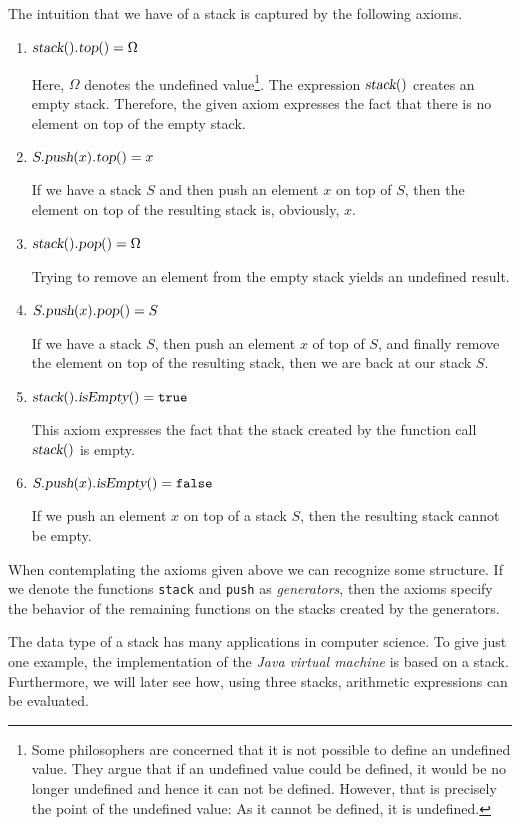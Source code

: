 The intuition that we have of a stack is captured by the following axioms.
\begin{enumerate}
\item $\textsl{stack}().\textsl{top}() = \Omega$

      Here, $\Omega$ denotes the undefined value\footnote{
       Some philosophers are concerned that it is not possible to define an undefined value.
       They argue that if an undefined value could be defined, it would be no longer undefined
       and hence it can not be defined.  However, that is precisely the point of the undefined 
       value: As it cannot be defined, it is undefined. \raisebox{-0.1cm}{$\Large\smiley$}}.  
      The expression $\textsl{stack}()$
      creates an empty stack.  Therefore, the given axiom expresses the fact that there is no
      element on top of the empty stack.
\item $S.\textsl{push}(x).\textsl{top}() = x$

      If we have a stack $S$ and then push an element $x$ on top of $S$, then the element on top
      of the resulting stack is, obviously, $x$.
\item $\textsl{stack}().\textsl{pop}() = \Omega$

      Trying to remove an element from the empty stack yields an undefined result.
\item $S.\textsl{push}(x).\textsl{pop}() = S$

      If we have a stack $S$, then push an element $x$ of top of $S$, and finally remove the element
      on top of the resulting stack, then we are back at our stack $S$.
    
\item $\textsl{stack}().\textsl{isEmpty}() = \mathtt{true}$

      This axiom expresses the fact that the stack created by the function call $\textsl{stack}()$
      is empty.
\item $S.\textsl{push}(x).\textsl{isEmpty}() = \mathtt{false}$

      If we push an element $x$ on top of a stack $S$, then the resulting stack cannot be empty.
\end{enumerate}
When contemplating the axioms given above we can recognize some structure.  If we denote the
functions \texttt{stack} and \texttt{push} as \emph{generators},  then the axioms specify the
behavior of the remaining functions on the stacks created by the generators.

The data type of a stack has many applications in computer science.  To give just one example, the
implementation of the \textsl{Java virtual machine} is based on a stack.  Furthermore,  we will
later see how,  using three stacks, arithmetic expressions can be evaluated.



